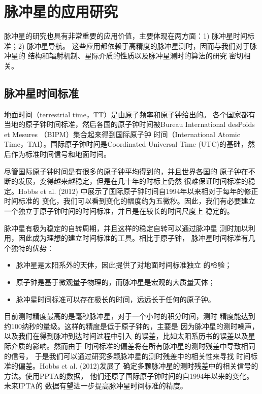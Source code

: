\section{脉冲星的应用研究}

脉冲星的研究也具有非常重要的应用价值，主要体现在两方面：1) 
脉冲星时间标准\supercite{hcm+12}；2) 脉冲星导航\supercite{dhy+13}。
这些应用都依赖于高精度的脉冲星测时，因而与我们对于脉冲星的
结构和辐射机制、星际介质的性质以及脉冲星测时的算法的研究
密切相关。

\subsection{脉冲星时间标准}

地面时间（terrestrial time，TT）是由原子频率和原子钟给出的。
各个国家都有当地的原子钟时间标准，然后各国的原子钟时间被Bureau 
International desPoids et Mesures （BIPM）集合起来得到国际原子钟
时间（International Atomic Time，TAI）。国际原子钟时间是Coordinated 
Universal Time (UTC)的基础，然后作为标准时间信号和地面时间。

尽管国际原子钟时间是有很多的原子钟平均得到的，并且世界各国的
原子钟在不断的发展，变得越来越稳定，但是在几十年的时标上仍然
很难保证时间标准的稳定。Hobbs et al. (2012)\supercite{hcm+12}
中展示了国际原子钟时间自1994年以来相对于每年的修正时间标准的
变化，我们可以看到变化的幅度约为五微秒。因此，我们有必要建立
一个独立于原子钟时间的时间标准，并且是在较长的时间尺度上
稳定的。

脉冲星有极为稳定的自转周期，并且这样的稳定自转可以通过脉冲星
测时加以利用，因此成为理想的建立时间标准的工具。相比于原子钟，
脉冲星时间标准有几个独特的优势：
\begin{itemize}
\item 脉冲星是太阳系外的天体，因此提供了对地面时间标准独立
的检验；
\item 原子钟是基于微观量子物理的，而脉冲星是宏观的大质量天体；
\item 脉冲星时间标准可以存在极长的时间，远远长于任何的原子钟。
\end{itemize}

目前测时精度最高的是毫秒脉冲星，对于一个小时的积分时间，测时
精度能达到约100纳秒的量级。这样的精度是低于原子钟的，主要是
因为脉冲星的测时噪声，以及我们在得到脉冲到达时间过程中引入
的误差，比如太阳系历书的误差以及星际介质的影响。然而由于
时间标准的偏差将在所有脉冲星的测时残差中导致相同的信号，
于是我们可以通过研究多颗脉冲星的测时残差中的相关性来寻找
时间标准的偏差。Hobbs et al. (2012)\supercite{hcm+12}发展了
确定多颗脉冲星的测时残差中的相关信号的方法。使用PPTA的数据，
他们还原了国际原子钟时间的自1994年以来的变化。未来IPTA的
数据有望进一步提高脉冲星时间标准的精度。

